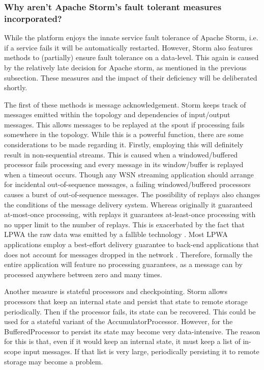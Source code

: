 \subsubsection{Why aren't Apache Storm's fault tolerant measures incorporated?}
While the platform enjoys the innate service fault tolerance of Apache Storm, i.e. if a service fails it will be automatically restarted. However, Storm also features methods to (partially) ensure fault tolerance on a data-level. This again is caused by the relatively late decision for Apache storm, as mentioned in the previous subsection. These measures and the impact of their deficiency will be deliberated shortly.

The first of these methods is message acknowledgement. Storm keeps track of messages emitted within the topology and dependencies of input/output messages. This allows messages to be replayed at the spout if processing fails somewhere in the topology. While this is a powerful function, there are some considerations to be made regarding it. Firstly, employing this will definitely result in non-sequential streams. This is caused when a windowed/buffered processor fails processing and every message in its window/buffer is replayed when a timeout occurs. Though any WSN streaming application should arrange for incidental out-of-sequence messages, a failing windowed/buffered processors causes a burst of out-of-sequence messages. The possibility of replays also changes the conditions of the message delivery system. Whereas originally it guaranteed at-most-once processing, with replays it guarantees at-least-once processing with no upper limit to the number of replays. This is exacerbated by the fact that LPWA the raw data was emitted by a fallible technology \cite{ontology}. Most LPWA applications employ a best-effort delivery guarantee to back-end applications that does not account for messages dropped in the network \cite{stream_requirements}. Therefore, formally the entire application will feature no processing guarantees, as a message can by processed anywhere between zero and many times.

Another measure is stateful processors and checkpointing. Storm allows processors that keep an internal state and persist that state to remote storage periodically. Then if the processor fails, its state can be recovered. This could be used for a stateful variant of the AccumulatorProcessor. However, for the BufferedProcessor to persist its state may become very data-intensive. The reason for this is that, even if it would keep an internal state, it must keep a list of in-scope input messages. If that list is very large, periodically persisting it to remote storage may become a problem.

